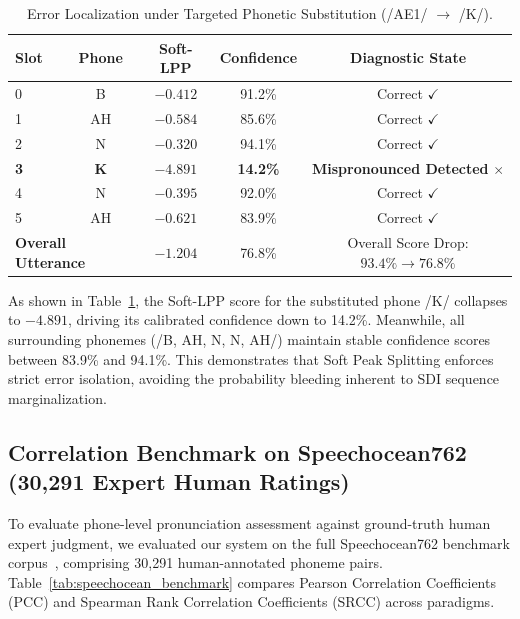 \documentclass[10pt,conference]{IEEEtran}
\begin{document}
\begin{table}[h]
\caption{Error Localization under Targeted Phonetic Substitution (/AE1/ $\to$ /K/).}
\label{tab:error_localization}
\centering
\begin{tabular}{lcccc}
\toprule
\textbf{Slot} & \textbf{Phone} & \textbf{Soft-LPP} & \textbf{Confidence} & \textbf{Diagnostic State} \\
\midrule
0 & B   & $-0.412$ & 91.2\% & Correct $\checkmark$ \\
1 & AH  & $-0.584$ & 85.6\% & Correct $\checkmark$ \\
2 & N   & $-0.320$ & 94.1\% & Correct $\checkmark$ \\
\textbf{3} & \textbf{K} & $\mathbf{-4.891}$ & \textbf{14.2\%} & \textbf{Mispronounced Detected} $\times$ \\
4 & N   & $-0.395$ & 92.0\% & Correct $\checkmark$ \\
5 & AH  & $-0.621$ & 83.9\% & Correct $\checkmark$ \\
\midrule
\multicolumn{2}{l}{\textbf{Overall Utterance}} & $-1.204$ & 76.8\% & Overall Score Drop: $93.4\% \to 76.8\%$ \\
\bottomrule
\end{tabular}
\end{table}

As shown in Table~\ref{tab:error_localization}, the Soft-LPP score for the substituted phone /K/ collapses to $-4.891$, driving its calibrated confidence down to 14.2\%. Meanwhile, all surrounding phonemes (/B, AH, N, N, AH/) maintain stable confidence scores between 83.9\% and 94.1\%. This demonstrates that Soft Peak Splitting enforces strict error isolation, avoiding the probability bleeding inherent to SDI sequence marginalization.

\subsection{Correlation Benchmark on Speechocean762 (30,291 Expert Human Ratings)}
\label{sec:speechocean_eval}
To evaluate phone-level pronunciation assessment against ground-truth human expert judgment, we evaluated our system on the full Speechocean762 benchmark corpus~\cite{zhang2021speechocean762}, comprising 30,291 human-annotated phoneme pairs. Table~\ref{tab:speechocean_benchmark} compares Pearson Correlation Coefficients (PCC) and Spearman Rank Correlation Coefficients (SRCC) across paradigms.
\end{document}
